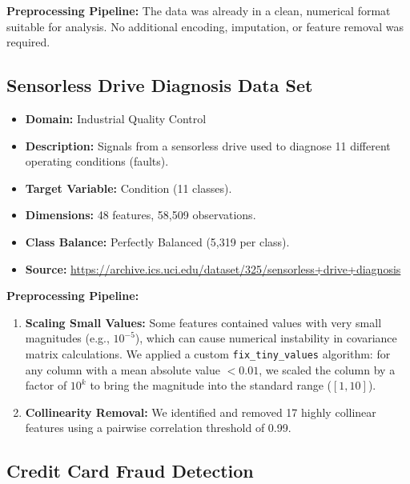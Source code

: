 \documentclass[a4paper,11pt,twoside]{report}
\theoremstyle{definition}
\begin{document}
\textbf{Preprocessing Pipeline:}
The data was already in a clean, numerical format suitable for analysis. No additional encoding, imputation, or feature removal was required.

\subsection{Sensorless Drive Diagnosis Data Set}
\label{sec:sensorless_drive_diagnosis}

\begin{itemize}
    \item \textbf{Domain:} Industrial Quality Control
    \item \textbf{Description:} Signals from a sensorless drive used to diagnose 11 different operating conditions (faults).
    \item \textbf{Target Variable:} Condition (11 classes).
    \item \textbf{Dimensions:} 48 features, 58,509 observations.
    \item \textbf{Class Balance:} Perfectly Balanced (5,319 per class).
    \item \textbf{Source:} \url{https://archive.ics.uci.edu/dataset/325/sensorless+drive+diagnosis}~\cite{dataset_for_sensorless_drive_diagnosis_325}
\end{itemize}

\textbf{Preprocessing Pipeline:}
\begin{enumerate}
    \item \textbf{Scaling Small Values:} Some features contained values with very small magnitudes (e.g., $10^{-5}$), which can cause numerical instability in covariance matrix calculations. We applied a custom \texttt{fix\_tiny\_values} algorithm: for any column with a mean absolute value $< 0.01$, we scaled the column by a factor of $10^k$ to bring the magnitude into the standard range ($[1, 10]$).
    \item \textbf{Collinearity Removal:} We identified and removed 17 highly collinear features using a pairwise correlation threshold of 0.99.
\end{enumerate}

\subsection{Credit Card Fraud Detection}
\end{document}
